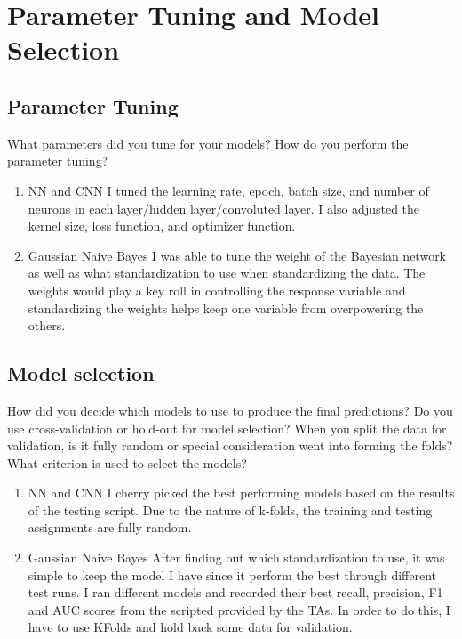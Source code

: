 \documentclass[11pt,a4paper]{article}
\begin{document}
\section{Parameter Tuning and Model Selection }
\subsection{Parameter Tuning}
What parameters did you tune for your models? How do you perform the parameter tuning?
\begin{enumerate}
	\item NN and CNN
		\subitem
		I tuned the learning rate, epoch, batch size, and number of neurons in each layer/hidden layer/convoluted layer.
		I also adjusted the kernel size, loss function, and optimizer function.
		
	\item Gaussian Naive Bayes
	    \subitem
	    I was able to tune the weight of the Bayesian network as well as what standardization to use when standardizing the data.
	    The weights would play a key roll in controlling the response variable and standardizing the weights helps keep one variable from overpowering the others.
\end{enumerate}


\subsection{Model selection}
How did you decide which models to use to produce the final predictions?  Do you use cross-validation or hold-out for model selection? When you split the data for validation, is it fully random or special consideration went into forming the folds? What criterion is used to select the models?

\begin{enumerate}
	\item NN and CNN
		\subitem
		I cherry picked the best performing models based on the results of the testing script.
		Due to the nature of k-folds, the training and testing assignments are fully random.
	\item Gaussian Naive Bayes
	    \subitem
	    After finding out which standardization to use, it was simple to keep the model I have since it perform the best through different test runs.
	    I ran different models and recorded their best recall, precision, F1 and AUC scores from the scripted provided by the TAs.
	    In order to do this, I have to use KFolds and hold back some data for validation.

\end{enumerate}
\end{document}
